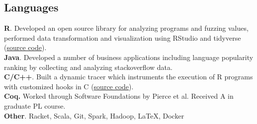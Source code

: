 \documentclass[margin,line]{resume}
\begin{document}
\begin{resume}
      
    \section{\mysidestyle Languages}
    \textbf{R}.  {\small Developed an open source library for analyzing programs and fuzzing values, performed data transformation and visualization using RStudio and tidyverse (\href{https://github.com/PRL-PRG/signatr}{source code}).}\\[\mymedskip]
    \textbf{Java}. {\small Developed a number of business applications including language popularity ranking by collecting and analyzing stackoverflow data.}\\[\mymedskip]
    \textbf{C/C++}. {\small Built a dynamic tracer which instruments the execution of R programs with customized hooks in C (\href{https://github.com/PRL-PRG/argtracer}{source code}).}\\[\mymedskip]
    \textbf{Coq.} {\small Worked through Software Foundations by Pierce et al. Received A in graduate PL course.}\\[\mymedskip]
    \textbf{Other}. Racket, Scala, Git, Spark, Hadoop, \LaTeX, Docker






\end{resume}
\end{document}
